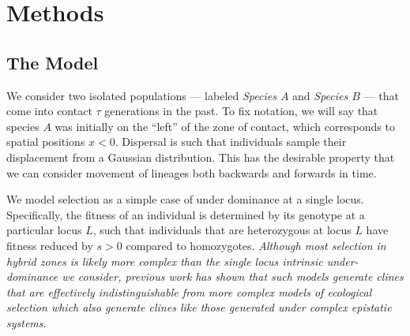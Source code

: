 \documentclass[11pt,letterpaper]{article}
\newcommand{\yb}[1]{{\em \color{magenta} #1}}
\begin{document}


	
\section*{Methods}
\subsection*{The Model}
We consider two isolated populations --- labeled \emph{Species $A$} and \emph{Species $B$} ---  that come into contact $\tau$ generations in the past.  To fix notation, we will say that species $A$ was initially on the ``left'' of the zone of contact, which corresponds to spatial positions $x<0$.  
Dispersal is  such that individuals sample their displacement from a Gaussian distribution. This has the desirable property that we can consider movement of lineages both backwards and forwards in time. 	

We model selection as a simple case of under dominance at a single locus.  Specifically, the fitness of an individual is determined by its genotype at a particular locus $L$, such that individuals that are heterozygous at locus $L$ have fitness reduced by $s>0$ compared to homozygotes. \yb{Although most selection in hybrid zones is likely more complex than the single locus intrinsic under-dominance we consider, previous work has shown that such models generate clines that are effectively indistinguishable from more complex models of ecological selection \citep{Barton1989, Barton1993} which also generate clines like those generated under complex epistatic systems}. 
\end{document}
